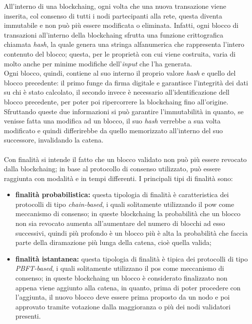 All'interno di una \gls{blockchaing}, ogni volta che una nuova transazione viene inserita, col consenso di tutti i nodi partecipanti alla rete, questa diventa immutabile e non può più essere modificata o eliminata. Infatti, ogni blocco di transazioni all'interno della \gls{blockchaing} sfrutta una funzione crittografica chiamata \textit{hash}, la quale genera una stringa alfanumerica che rappresenta l'intero contenuto del blocco; questa, per le proprietà con cui viene costruita, varia di molto anche per minime modifiche dell'\textit{input} che l'ha generata.\\
Ogni blocco, quindi, contiene al suo interno il proprio valore \textit{hash} e quello del blocco precedente: il primo funge da firma digitale e garantisce l'integrità dei dati su chi è stato calcolato, il secondo invece è necessario all'identificazione dell blocco precedente, per poter poi ripercorrere la \gls{blockchaing} fino all'origine. Sfruttando queste due informazioni si può garantire l'immutabilità in quanto, se venisse fatta una modifica ad un blocco, il suo \textit{hash} verrebbe a sua volta modificato e quindi differirebbe da quello memorizzato all'interno del suo successore, invalidando la catena.
\\\\
Con finalità si intende il fatto che un blocco validato non può più essere revocato dalla \gls{blockchaing}; in base al protocollo di consenso utilizzato, può essere raggiunta con modalità e in tempi differenti. I principali tipi di finalità sono:

\begin{itemize}
	\item \textbf{finalità probabilistica:} questa tipologia di finalità è caratteristica dei protocolli di tipo \textit{chain-based}, i quali solitamente utilizzando il \gls{pow} come meccanismo di consenso; in queste \gls{blockchaing} la probabilità che un blocco non sia revocato aumenta all'aumentare del numero di blocchi ad esso successivi, quindi più profondo è un blocco più è alta la probabilità che faccia parte della diramazione più lunga della catena, cioè quella valida;
	\item \textbf{finalità istantanea:} questa tipologia di finalità è tipica dei protocolli di tipo \textit{PBFT-based}, i quali solitamente utilizzano il \gls{pos} come meccanismo di consenso; in queste \gls{blockchaing} un blocco è considerato finalizzato non appena viene aggiunto alla catena, in quanto, prima di poter procedere con l'aggiunta, il nuovo blocco deve essere prima proposto da un nodo e poi approvato tramite votazione dalla maggioranza o più dei nodi validatori presenti.
\end{itemize} 

